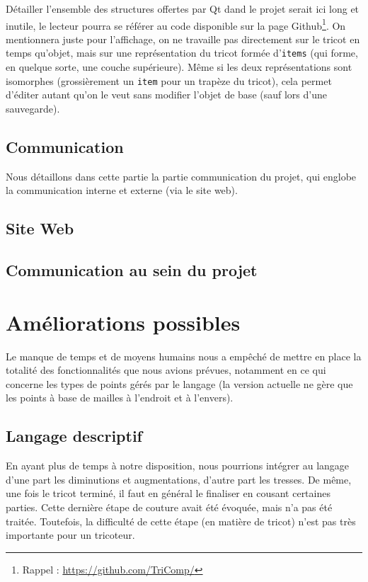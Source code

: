 \documentclass{article}
\begin{document}
Détailler l'ensemble des structures offertes par Qt dand le projet serait ici long et inutile, le lecteur pourra se référer au code disponible sur la page Github\footnote{Rappel : \url{https://github.com/TriComp/}}. On mentionnera juste pour l'affichage, on ne travaille pas directement sur le tricot en temps qu'objet, mais sur une représentation du tricot formée d'\texttt{items} (qui forme, en quelque sorte, une couche supérieure). Même si les deux représentations sont isomorphes (grossièrement un \texttt{item} pour un trapèze du tricot), cela permet d'éditer autant qu'on le veut sans modifier l'objet de base (sauf lors d'une sauvegarde).

\subsection{Communication}

Nous détaillons dans cette partie la partie communication du projet, qui englobe la communication interne et externe (via le site web).

\subsection{Site Web}

\subsection{Communication au sein du projet}

\section{Améliorations possibles}

Le manque de temps et de moyens humains nous a empêché de mettre en place la totalité des fonctionnalités que nous avions prévues, notamment en ce qui concerne les 
types de points gérés par le langage (la version actuelle ne gère que les points à base de mailles à l'endroit et à l'envers).

\subsection{Langage descriptif}
En ayant plus de temps à notre disposition, nous pourrions intégrer au langage d'une part les diminutions et augmentations, d'autre part les tresses. De même, une fois le tricot terminé, il faut en général le finaliser en cousant certaines parties. Cette dernière étape de couture avait été évoquée, mais n'a pas été traitée. Toutefois, la difficulté de cette étape (en matière de tricot) n'est pas très importante pour un tricoteur.
\end{document}
